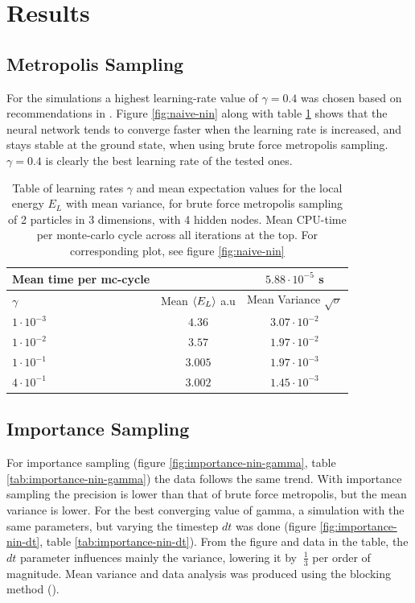 \section{Results}
\subsection{Metropolis Sampling}
For the simulations a highest learning-rate value of $\gamma = 0.4$ was chosen based on recommendations in \cite{Marsland}.
Figure \ref{fig:naive-nin} along with table \ref{tab:naive-nin} shows that the neural network tends to converge faster when the learning rate is increased,
and stays stable at the ground state, when using brute force metropolis sampling. $\gamma = 0.4$ is clearly the best learning rate of the tested ones.
\begin{table}[h]
\begin{tabular}{l c c}
	Mean time per mc-cycle & &$5.88\cdot10^{-5}$ s \\
	\hline
	$\gamma$ & Mean $\langle E_L \rangle$ a.u & Mean Variance $\sqrt{\sigma}$\\
	\hline
	$1\cdot10^{-3}$ & $4.36$ & $3.07\cdot10^{-2}$ \\
	$1\cdot10^{-2}$ & $3.57$ & $1.97\cdot10^{-2}$ \\
	$1\cdot10^{-1}$ & $3.005$ & $1.97\cdot10^{-3}$ \\
	$4\cdot10^{-1}$ & $3.002$ & $1.45\cdot10^{-3}$ \\
\end{tabular}
\label{tab:naive-nin}
\caption{Table of learning rates $\gamma$ and mean expectation values for the local energy $E_L$ with mean variance, for brute force metropolis sampling
		of 2 particles in 3 dimensions, with 4 hidden nodes.
		Mean CPU-time per monte-carlo cycle across all iterations at the top.
	For corresponding plot, see figure \ref{fig:naive-nin}}
\end{table}

\subsection{Importance Sampling}
For importance sampling (figure \ref{fig:importance-nin-gamma}, table \ref{tab:importance-nin-gamma})
the data follows the same trend. With importance sampling the precision is lower than that of brute
force metropolis, but the mean variance is lower.
For the best converging value of gamma, a simulation with the same parameters, but varying the
timestep $dt$ was done (figure \ref{fig:importance-nin-dt}, table \ref{tab:importance-nin-dt}).
From the figure and data in the table, the $dt$ parameter influences mainly the variance,
lowering it by $~\frac{1}{3}$ per order of magnitude.
Mean variance and data analysis was produced using the blocking method (\cite{Lectures-blocking}).

